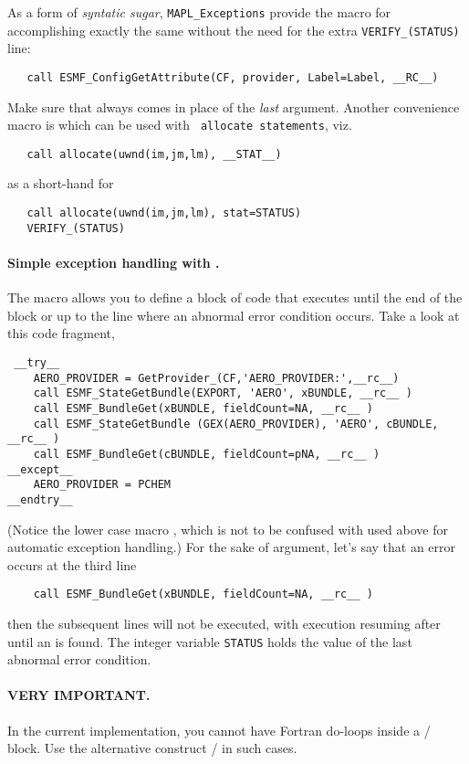 As a form of {\em syntatic sugar}, {\tt MAPL\_Exceptions} provide the
macro  for accomplishing exactly the same without the need for
the extra {\tt VERIFY\_(STATUS)} line:
\begin{verbatim}
   call ESMF_ConfigGetAttribute(CF, provider, Label=Label, __RC__)
\end{verbatim}
Make sure that  always comes in place of the {\em last} argument.
Another convenience macro is  which can be used with {\tt
  allocate statements}, viz.
\begin{verbatim}
   call allocate(uwnd(im,jm,lm), __STAT__)
\end{verbatim}
as a short-hand for
\begin{verbatim}
   call allocate(uwnd(im,jm,lm), stat=STATUS)
   VERIFY_(STATUS)
\end{verbatim}



\paragraph{Simple exception handling with . }

The  macro allows you to define a block of code that executes
until the end of the block or up to the line where an abnormal error
condition occurs. Take a look at this code fragment,
\begin{verbatim}
 __try__
    AERO_PROVIDER = GetProvider_(CF,'AERO_PROVIDER:',__rc__)
    call ESMF_StateGetBundle(EXPORT, 'AERO', xBUNDLE, __rc__ )
    call ESMF_BundleGet(xBUNDLE, fieldCount=NA, __rc__ )
    call ESMF_StateGetBundle (GEX(AERO_PROVIDER), 'AERO', cBUNDLE, __rc__ )
    call ESMF_BundleGet(cBUNDLE, fieldCount=pNA, __rc__ )
__except__
    AERO_PROVIDER = PCHEM
__endtry__
\end{verbatim}
(Notice the lower case macro , which is not to be confused with
 used above for automatic exception handling.) For the sake of
argument, let's say that an error occurs at the third line
\begin{verbatim}
    call ESMF_BundleGet(xBUNDLE, fieldCount=NA, __rc__ )
\end{verbatim}
then the subsequent lines will not be executed, with execution
resuming after  until an  is found. The integer
variable {\tt STATUS} holds the value of the last abnormal error condition.

\paragraph{VERY IMPORTANT.} In the current implementation, you cannot
have Fortran do-loops inside a / block. Use the
alternative construct / in such cases.

